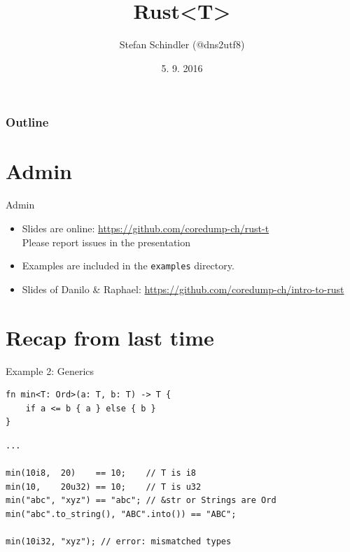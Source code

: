 \documentclass[aspectratio=1610,t]{beamer}
\title{Rust<T>}
\date{5. 9. 2016}
\author{Stefan Schindler (@dns2utf8)}
\institute{Coredump Rapperswil @ Mozilla.ch Meetup}
\begin{document}
{
\maketitle
}

\begin{frame}[noframenumbering]
	\frametitle{Outline}
	\tableofcontents
\end{frame}



{
\section{Admin}
}

\begin{frame}[fragile]{Admin}

\begin{itemize}
  \item Slides are online:
        \url{https://github.com/coredump-ch/rust-t}
        \\ Please report issues in the presentation
  \item Examples are included in the \texttt{examples} directory.
  \item Slides of Danilo \& Raphael:
        \url{https://github.com/coredump-ch/intro-to-rust}
\end{itemize}

\end{frame}

{
\section{Recap from last time}
}

\begin{frame}[fragile]{Example 2: Generics}

\begin{verbatim}
fn min<T: Ord>(a: T, b: T) -> T {
    if a <= b { a } else { b }
}
\end{verbatim}
\pause
\begin{verbatim}
...

min(10i8,  20)    == 10;    // T is i8
min(10,    20u32) == 10;    // T is u32
min("abc", "xyz") == "abc"; // &str or Strings are Ord
min("abc".to_string(), "ABC".into()) == "ABC";

min(10i32, "xyz"); // error: mismatched types
\end{verbatim}

\end{frame}
\end{document}
